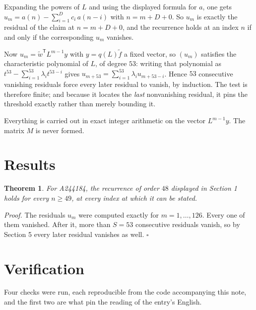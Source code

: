 \documentclass[11pt]{article}
\newtheorem{theorem}{Theorem}
\theoremstyle{definition}
\begin{document}
Expanding the powers of $L$ and using the displayed formula for $a$, one gets $u_m = a(n) - \sum_{i=1}^{D} c_i\,a(n-i)$ with $n = m + D + 0$. So $u_m$ is exactly the residual of the claim at $n = m + D + 0$, and the recurrence holds at an index $n$ if and only if the corresponding $u_m$ vanishes.

Now $u_m = \tilde w^{\mathsf T} L^{m-1} y$ with $y = q(L)\tilde f$ a fixed vector, so $(u_m)$ satisfies the characteristic polynomial of $L$, of degree $53$: writing that polynomial as $t^{53} - \sum_{i=1}^{53} \lambda_i t^{53-i}$ gives $u_{m+53} = \sum_{i=1}^{53} \lambda_i u_{m+53-i}$. Hence $53$ consecutive vanishing residuals force every later residual to vanish, by induction. The test is therefore finite; and because it locates the {\itshape last} nonvanishing residual, it pins the threshold exactly rather than merely bounding it.

Everything is carried out in exact integer arithmetic on the vector $L^{m-1}y$. The matrix $M$ is never formed.

\section{Results}

\begin{theorem} For A244184, the recurrence of order $48$ displayed in Section 1 holds for every $n \ge 49$, at every index at which it can be stated.\end{theorem}

{\itshape Proof.} The residuals $u_m$ were computed exactly for $m = 1,\dots,126$. Every one of them vanished. After it, more than $S = 53$ consecutive residuals vanish, so by Section 5 every later residual vanishes as well. $\square$

\section{Verification}

Four checks were run, each reproducible from the code accompanying this note, and the first two are what pin the reading of the entry's English.
\end{document}
